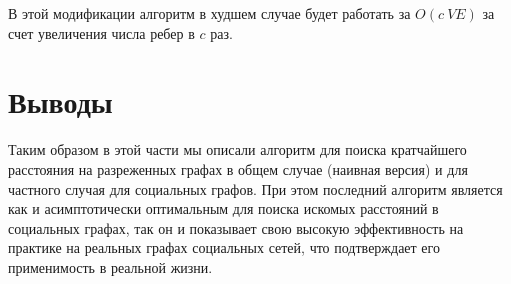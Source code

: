 В этой модификации алгоритм в худшем случае будет работать за $O(c \ VE)$ за счет увеличения числа ребер в $c$ раз.

\FloatBarrier
\section{Выводы}
Таким образом в этой части мы описали алгоритм для поиска кратчайшего расстояния на разреженных графах в общем случае (наивная версия) и для частного случая для социальных графов. При этом последний алгоритм является как и асимптотически оптимальным для поиска искомых расстояний в социальных графах, так он и показывает свою высокую эффективность на практике на реальных графах социальных сетей, что подтверждает его применимость в реальной жизни.
\FloatBarrier
